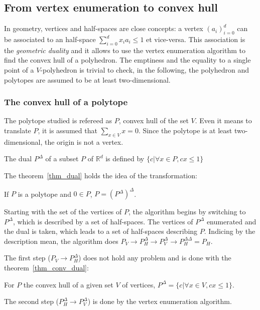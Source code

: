 \subsection{From vertex enumeration to convex hull}

In geometry, vertices and half-spaces are close concepts: a vertex $(a_i)_{i=0}^d$ can be associated to an half-space $\sum_{i=0}^d x_i a_i \leq 1$ et vice-versa. This association is the \emph{geometric duality} and it allows to use the vertex enumeration algorithm to find the convex hull of a polyhedron. The emptiness and the equality to a single point of a $V$-polyhedron is trivial to check, in the following, the polyhedron and polytopes are assumed to be at least two-dimensional. 
\subsubsection{The convex hull of a polytope}
The polytope studied is refereed as $P$, convex hull of the set $V$. Even it means to translate $P$, it is assumed that $\sum_{x\in V} x = 0 $. Since the polytope is at least two-dimensional, the origin is not a vertex. 

\begin{definition}
The dual $P^\Delta$ of a subset $P$ of $\mathbb{R}^d$ is defined by $\{c | \forall x \in P, cx\leq 1  \}$
\end{definition}

The theorem~\ref{thm_dual} holds the idea of the transformation:

\begin{theorem}
If $P$ is a polytope and $0\in P$, $P=(P^\Delta)^\Delta$.
\label{thm_dual}
\end{theorem}

Starting with the set of the vertices of $P$, the algorithm begins by switching to $P^\Delta$, which is described by a set of half-spaces. The vertices of $P^\Delta$ enumerated and the dual is taken, which leads to a set of half-spaces describing $P$. Indicing by the description mean, the algorithm does $ P_V \rightarrow P_H^\Delta \rightarrow P_V^\Delta \rightarrow P_H^{\Delta\Delta} = P_H $. 

The first step ($P_V \rightarrow P_H^\Delta$) does not hold any problem and is done with the theorem~\ref{thm_conv_dual}:
\begin{theorem}
For $P$ the convex hull of a given set $V$ of vertices, $P^\Delta=\{c | \forall x \in V, cx\leq 1\}$.
\label{thm_conv_dual}
\end{theorem}
The second step ($P_H^\Delta \rightarrow P_V^\Delta$) is done by the vertex enumeration algorithm. 

